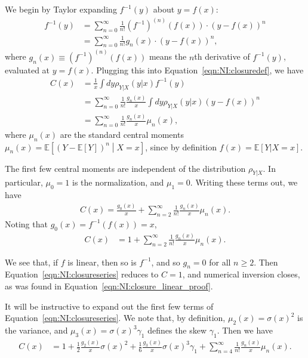We begin by Taylor expanding $f^{-1}(y)$ about $y=f(x)$:
\begin{align}
f^{-1}(y) &= \sum_{n=0}^\infty \frac{1}{n!}\left(f^{-1}\right)^{(n)}\left(f(x)\right)\cdot\left(y-f(x)\right)^n\nonumber\\
&=\sum_{n=0}^\infty \frac{1}{n!}g_n(x)\cdot\left(y-f(x)\right)^n,
\end{align}
where $g_n(x) \equiv (f^{-1})^{(n)}(f(x))$ means the $n$th derivative of $f^{-1}(y)$, evaluated at $y=f(x)$. Plugging this into Equation~\ref{eqn:NI:closuredef}, we have
\begin{align}
  C(x) &= \frac{1}{x}\int dy \rho_{Y|X}(y|x) f^{-1}(y)\nonumber\\
&=\sum_{n=0}^\infty \frac{1}{n!}\frac{g_n(x)}{x}\int dy \rho_{Y|X}(y|x) \left(y-f(x)\right)^n\nonumber\\
&=\sum_{n=0}^\infty \frac{1}{n!}\frac{g_n(x)}{x} \mu_n(x),
\end{align}
where $\mu_n(x)$ are the standard central moments $\mu_n(x) = \mathbb{E}\left[\left(Y-\mathbb{E}\left[Y\right]\right)^n\middle| X=x\right]$, since by definition $f(x)=\mathbb{E}[Y|X=x]$.

The first few central moments are independent of the distribution $\rho_{Y|X}$.  In particular, $\mu_0 = 1$ is the normalization, and $\mu_1 = 0$. Writing these terms out, we have
\begin{align}
  C(x) =\frac{g_0(x)}{x}+\sum_{n=2}^\infty \frac{1}{n!}\frac{g_n(x)}{x} \mu_n(x).
\end{align}
Noting that $g_0(x) = f^{-1}(f(x)) = x$,
\begin{align}
  C(x) &=1+\sum_{n=2}^\infty \frac{1}{n!}\frac{g_n(x)}{x} \mu_n(x).\label{eqn:NI:closureseries}
\end{align}

\noindent We see that, if $f$ is linear, then so is $f^{-1}$, and so $g_n = 0$ for all $n\ge 2$. Then Equation~\ref{eqn:NI:closureseries} reduces to $C=1$, and numerical inversion closes, as was found in Equation~\ref{eqn:NI:closure_linear_proof}.

It will be instructive to expand out the first few terms of Equation~\ref{eqn:NI:closureseries}. We note that, by definition, $\mu_2(x) = \sigma(x)^2$ is the variance, and $\mu_3(x) = \sigma(x)^3\gamma_1$ defines the skew $\gamma_1$. Then we have
\begin{align}
  C(x) &=1+\frac{1}{2}\frac{g_2(x)}{x}\sigma(x)^2+\frac{1}{6}\frac{g_3(x)}{x}\sigma(x)^3\gamma_1+\sum_{n=4}^\infty \frac{1}{n!}\frac{g_n(x)}{x} \mu_n(x).\label{eqn:NI:closureseriesexpand}
\end{align}

